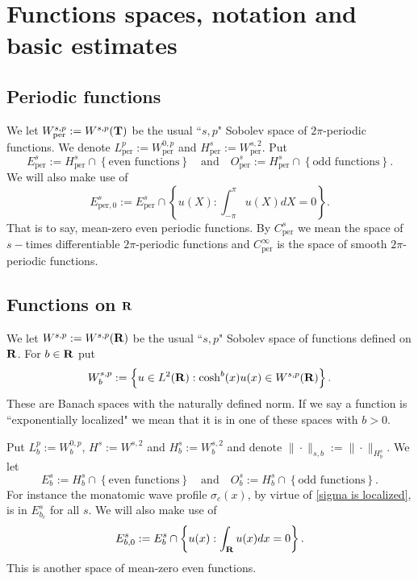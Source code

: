 \documentclass[12pt]{amsart}
\numberwithin{equation}{section}
\newcommand{\per}{{\text{per}}}
\newcommand{\be}{\begin{equation}}
\newcommand{\ee}{\end{equation}}
\newcommand{\mand}{\quad \text{and}\quad}
\newcommand{\R}{{\bf{R}}}
\newcommand{\T}{{\bf{T}}}
\begin{document}
\section{Functions spaces, notation and basic estimates}\label{preliminaries}

\subsection{Periodic functions}
We let $W^{s,p}_\per:=W^{s,p}(\T)$ be  the usual ``$s,p$" Sobolev
space of $2 \pi$-periodic functions. We denote $L^p_\per:=W^{0,p}_\per$ and
 $H^s_\per:=W^{s,2}_\per$.
Put
\be\label{per spaces}
E^s_\per:=H^s_{\per} \cap \left\{\text{even functions} \right\}\mand O^s_\per:=H^s_{\per} \cap \left\{\text{odd functions} \right\}.\ee
We will also make use of 
\be\label{per0 spaces}
E^s_{\per,0}:=E^s_{\per} \cap \left\{u(X):\int_{-\pi}^\pi u(X) dX = 0 \right\}.
\ee
That is to say, mean-zero even periodic functions.
By $C^s_\per$ we mean the space of $s-$times differentiable $2\pi$-periodic functions
and $C^\infty_\per$ is the space of smooth $2\pi$-periodic functions. 

\subsection{Functions on $\R$}
We let $W^{s,p}:=W^{s,p}(\R)$ be the usual ``$s,p$" Sobolev
space of functions defined on  $\R$. For $b \in \R$ put
\be\label{Wspb spaces}
W^{s,p}_{b} := \left\{ u \in L^2(\R) : \cosh^b(x) u(x) \in W^{s,p}(\R) \right\} .
\ee
These are Banach spaces with the naturally defined norm. 
If we say a function is ``exponentially localized" we mean that it is in one of these spaces with $b > 0$.

 Put $L^p_b:=W^{0,p}_b$, 
$H^s:=W^{s,2}$ and $H^s_b:=W^{s,2}_b$ and 
denote $\| \cdot \|_{s,b}:=\| \cdot \|_{H^s_b}$. We let 
\be\label{sb spaces}
E^s_b:=H^s_{b} \cap \left\{\text{even functions} \right\}\mand O^s_b:=H^s_{b} \cap \left\{\text{odd functions} 
\right\}.
\ee
For instance the monatomic wave profile $\sigma_c(x)$, by virtue of \eqref{sigma is localized}, is in $E^s_{b_c}$ for all $s$.
We will also make use of 
\be\label{sb0 spaces}
E^s_{b,0}:=E^s_{b} \cap \left\{u(x):\int_\R u(x) dx = 0 \right\}.
\ee
This is another space of mean-zero even functions.
\end{document}
